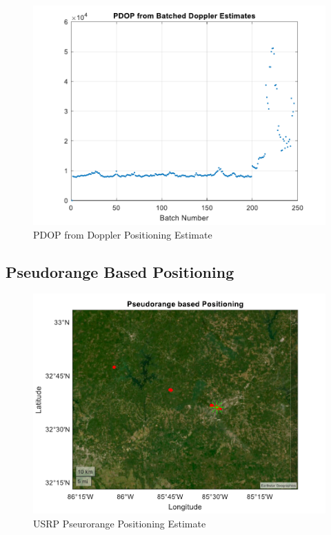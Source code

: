 \documentclass[12pt]{report}
\begin{document}
\begin{figure}[h!]
    \centering
    \includegraphics[width=5in]
    {15min_irid_USRP_doppler_pdop.pdf}
    \caption{PDOP from Doppler Positioning Estimate}
    \label{fig:USRPDoppler15minIridPDOP}
\end{figure}


\subsection{Pseudorange Based Positioning}
\begin{figure}[h!]
    \centering
    \includegraphics[width=5in]
    {15min_irid_USRP_pseudo.pdf}
    \caption{USRP Pseurorange Positioning Estimate}
    \label{fig:USRPpseudo15minIridPosit}
\end{figure}
\end{document}
